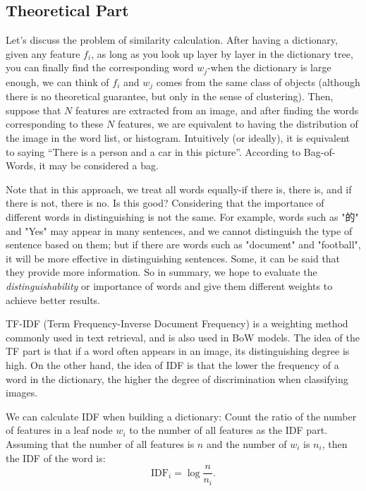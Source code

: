 \subsection{Theoretical Part}
Let's discuss the problem of similarity calculation. After having a dictionary, given any feature $f_i$, as long as you look up layer by layer in the dictionary tree, you can finally find the corresponding word $w_j$-when the dictionary is large enough, we can think of $f_i$ and $ w_j$ comes from the same class of objects (although there is no theoretical guarantee, but only in the sense of clustering). Then, suppose that $N$ features are extracted from an image, and after finding the words corresponding to these $N$ features, we are equivalent to having the distribution of the image in the word list, or histogram. Intuitively (or ideally), it is equivalent to saying ``There is a person and a car in this picture''. According to Bag-of-Words, it may be considered a bag.

Note that in this approach, we treat all words equally-if there is, there is, and if there is not, there is no. Is this good? Considering that the importance of different words in distinguishing is not the same. For example, words such as "的" and "Yes" may appear in many sentences, and we cannot distinguish the type of sentence based on them; but if there are words such as "document" and "football", it will be more effective in distinguishing sentences. Some, it can be said that they provide more information. So in summary, we hope to evaluate the \textit{distinguishability} or importance of words and give them different weights to achieve better results.

TF-IDF (Term Frequency-Inverse Document Frequency)\textsuperscript{\cite{Sivic2003, Robertson2004}} is a weighting method commonly used in text retrieval, and is also used in BoW models. The idea of the TF part is that if a word often appears in an image, its distinguishing degree is high. On the other hand, the idea of IDF is that the lower the frequency of a word in the dictionary, the higher the degree of discrimination when classifying images.

We can calculate IDF when building a dictionary: Count the ratio of the number of features in a leaf node $w_i$ to the number of all features as the IDF part. Assuming that the number of all features is $n$ and the number of $w_i$ is $n_i$, then the IDF of the word is:
\begin{equation}
	\mathrm{IDF}_i = \log \frac{n}{n_i}.
\end{equation}


